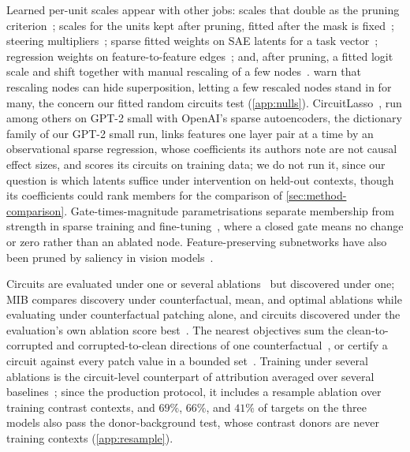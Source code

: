 \documentclass[10pt]{article}
\begin{document}
Learned per-unit scales appear with other jobs: scales that double as the pruning criterion~\citep{liu2017learning, huang2018data, you2019gate}; scales for the units kept after pruning, fitted after the mask is fixed~\citep{kwon2022fast, he2017channel}; steering multipliers~\citep{stoehr2024activation}; sparse fitted weights on SAE latents for a task vector~\citep{kharlapenko2025scaling}; regression weights on feature-to-feature edges~\citep{yin2026scalable}; and, after pruning, a fitted logit scale and shift together with manual rescaling of a few nodes~\citep{gao2025weightsparse}.
\citet{gao2025weightsparse} warn that rescaling nodes can hide superposition, letting a few rescaled nodes stand in for many, the concern our fitted random circuits test (\cref{app:nulls}).
CircuitLasso~\citep{yin2026scalable}, run among others on GPT-2 small with OpenAI's sparse autoencoders, the dictionary family of our GPT-2 small run, links features one layer pair at a time by an observational sparse regression, whose coefficients its authors note are not causal effect sizes, and scores its circuits on training data; we do not run it, since our question is which latents suffice under intervention on held-out contexts, though its coefficients could rank members for the comparison of \cref{sec:method-comparison}.
Gate-times-magnitude parametrisations separate membership from strength in sparse training and fine-tuning~\citep{louizos2018learning, guo2021parameter, lai2025joint}, where a closed gate means no change or zero rather than an ablated node.
Feature-preserving subnetworks have also been pruned by saliency in vision models~\citep{hamblin2022pruning}.

Circuits are evaluated under one or several ablations~\citep{miller2024transformer} but discovered under one; MIB compares discovery under counterfactual, mean, and optimal ablations while evaluating under counterfactual patching alone, and circuits discovered under the evaluation's own ablation score best~\citep{mueller2025mib}.
The nearest objectives sum the clean-to-corrupted and corrupted-to-clean directions of one counterfactual~\citep{chen2025rethinking}, or certify a circuit against every patch value in a bounded set~\citep{hadad2026formal}.
Training under several ablations is the circuit-level counterpart of attribution averaged over several baselines~\citep{kapishnikov2019xrai, erion2021improving}; since the production protocol, it includes a resample ablation over training contrast contexts, and $69\%$, $66\%$, and $41\%$ of targets on the three models also pass the donor-background test, whose contrast donors are never training contexts (\cref{app:resample}).
\end{document}
